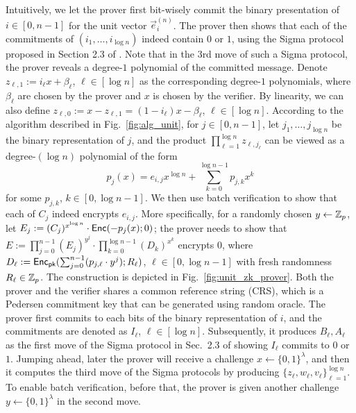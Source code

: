 Intuitively, we let the prover first bit-wisely commit the binary presentation of $i\in[0,n-1]$ for the unit vector $\vec{e}_i^{(n)}$. The prover then shows that each of the commitments of $(i_1,\ldots, i_{\log n})$ indeed contain $0$ or $1$, using the Sigma protocol proposed in Section 2.3 of \cite{Groth2015}. Note that in the 3rd move of such a Sigma protocol, the prover reveals a degree-$1$ polynomial of the committed message.  Denote $z_{\ell,1}:=i_\ell x + \beta_\ell$, $\ell\in[\log n]$ as the corresponding degree-$1$ polynomials, where $\beta_\ell$ are chosen by the prover and $x$ is chosen by the verifier. By linearity, we can also define $z_{\ell,0}:= x - z_{\ell,1 }= (1-i_\ell) x -\beta_\ell$, $\ell\in[\log n]$.  According to the algorithm described in Fig.~\ref{fig:alg_unit}, for $j\in[0,n-1]$, let  $j_1,\ldots, j_{\log n}$ be the binary representation of $j$, and the product $\prod_{\ell=1}^{\log n} z_{\ell, j_\ell}$ can be viewed as a degree-$(\log n)$ polynomial of the form
$$
p_j(x) = e_{i,j} x^{\log n} + \sum_{k=0}^{\log n -1} p_{j,k} x^k 
$$
for some $p_{j,k}$, $k\in[0,\log n -1]$. We then use batch verification to show that each of $C_j$ indeed encrypts $e_{i,j}$. More specifically, for a randomly chosen $y\leftarrow \mathbb{Z}_p$, let $E_j:=(C_j )^{x^{\log n}} \cdot \mathsf{Enc}(-p_j(x);0)$; the prover needs to show that $E:= \prod_{j=0}^{n-1} (E_j) ^{y^j} \cdot \prod_{k=0}^{\log n -1} (D_k) ^{x^k}$ encrypts $0$, where $D_\ell:= \mathsf{Enc}_{\mathsf{pk}}(\sum_{j=0}^{n-1} (p_{j,\ell} \cdot y^j) ; R_{\ell})$, $\ell\in[0,\log n -1]$ with fresh randomness $R_\ell\in\mathbb{Z}_p$. The construction is depicted in Fig.~\ref{fig:unit_zk_prover}. Both the prover and the verifier shares a common reference string (CRS), which is a Pedersen commitment key that can be generated using random oracle. %
The prover first commits to each bits of the binary representation of $i$, and the commitments are denoted as $I_\ell$, $\ell\in[\log n]$. Subsequently, it produces $B_\ell,A_\ell$ as the first move of the Sigma protocol in Sec.~2.3 of \cite{Groth2015} showing $I_\ell$ commits to $0$ or $1$. Jumping ahead, later the prover will receive a challenge $x\leftarrow \{0,1\}^\lambda$, and then it computes the third move of the Sigma protocols by producing $\{z_\ell,w_\ell,v_\ell\}_{\ell=1}^{\log n}$. To enable batch verification, before that, the prover is given another challenge $y\leftarrow \{0,1\}^\lambda$ in the second move. 

